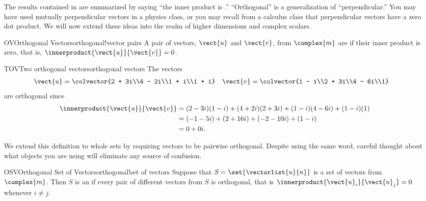%
The results contained in  are summarized by saying ``the inner product is .''
%
%
%
%
``Orthogonal'' is a generalization of ``perpendicular.''  You may have used mutually perpendicular vectors in a physics class, or you may recall from a calculus class that perpendicular vectors have a zero dot product.  We will now extend these ideas into the realm of higher dimensions and complex scalars.
%
%
\begin{definition}{OV}{Orthogonal Vectors}{orthogonal!vector pairs}
A pair of vectors, $\vect{u}$ and $\vect{v}$, from $\complex{m}$ are  if their inner product is zero, that is, $\innerproduct{\vect{u}}{\vect{v}}=0$.
\end{definition}
%
%
\begin{example}{TOV}{Two orthogonal vectors}{orthogonal vectors}
The vectors
%
\begin{align*}
\vect{u}&=\colvector{2 + 3i\\4 - 2i\\1 + i\\1 + i}
&
\vect{v}&=\colvector{1 - i\\2 + 3i\\4 - 6i\\1}
\end{align*}
%
are orthogonal since
%
\begin{align*}
\innerproduct{\vect{u}}{\vect{v}}
&=(2-3i)(1-i)+(4+2i)(2+3i)+(1-i)(4-6i)+(1-i)(1)\\
&=(-1-5i)+(2+16i)+(-2-10i)+(1-i)\\
&=0+0i.
\end{align*}
%
\end{example}
%
We extend this definition to whole sets by requiring vectors to be pairwise orthogonal.  Despite using the same word, careful thought about what objects you are using will eliminate any source of confusion.
%
\begin{definition}{OSV}{Orthogonal Set of Vectors}{orthogonal!set of vectors}
Suppose that $S=\set{\vectorlist{u}{n}}$ is a set of vectors from $\complex{m}$.  Then $S$ is an  if every pair of different vectors from $S$ is orthogonal, that is $\innerproduct{\vect{u}_i}{\vect{u}_j}=0$ whenever $i\neq j$.
\end{definition}
%
